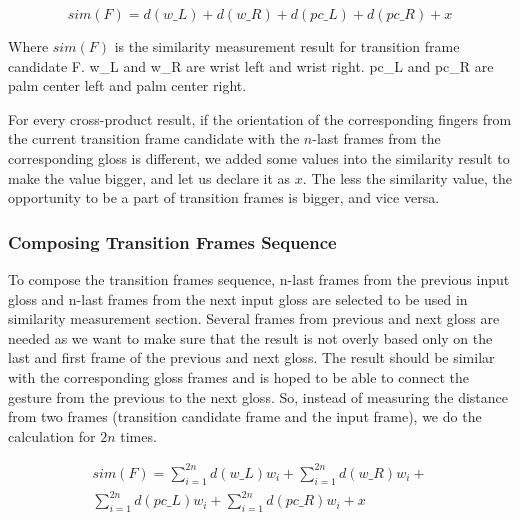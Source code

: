 \documentclass{sig-alternate-05-2015}
\begin{document}
\begin{equation}sim(F)=d(w\_L)+d(w\_R)+d(pc\_L)+d(pc\_R)+x\end{equation}

Where \begin{math}sim(F)\end{math} is the similarity measurement result for transition frame candidate F. w\_L and w\_R are wrist left and wrist right. pc\_L and pc\_R are palm center left and palm center right.

For every cross-product result, if the orientation of the corresponding fingers from the current transition frame candidate with the \begin{math}n\end{math}-last frames from the corresponding gloss is different, we added some values into the similarity result to make the value bigger, and let us declare it as \begin{math}x\end{math}. The less the similarity value, the opportunity to be a part of transition frames is bigger, and vice versa.

\subsubsection{Composing Transition Frames Sequence}
To compose the transition frames sequence, n-last frames from the previous input gloss and n-last frames from the next input gloss are selected to be used in similarity measurement section. Several frames from previous and next gloss are needed as we want to make sure that the result is not overly based only on the last and first frame of the previous and next gloss. The result should be similar with the corresponding gloss frames and is hoped to be able to connect the gesture from the previous to the next gloss. So, instead of measuring the distance from two frames (transition candidate frame and the input frame), we do the calculation for \begin{math}2n\end{math} times.

\begin{equation}
\begin{aligned}
sim(F)=\sum_{i=1}^{2n}d(w\_L)w_i+\sum_{i=1}^{2n}d(w\_R)w_i+\\
 \sum_{i=1}^{2n}d(pc\_L)w_i+\sum_{i=1}^{2n}d(pc\_R)w_i+x
\end{aligned}
\end{equation}
\end{document}
